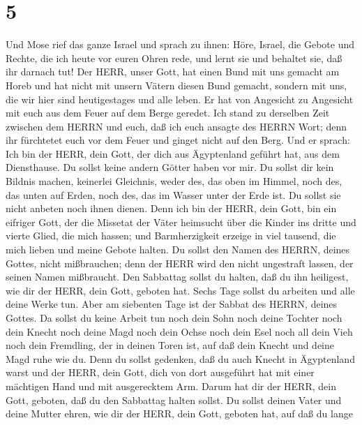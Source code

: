 \hypertarget{section-4}{%
\section{5}\label{section-4}}

 Und Mose rief das ganze Israel und sprach zu ihnen: Höre,
Israel, die Gebote und Rechte, die ich heute vor euren Ohren rede, und
lernt sie und behaltet sie, daß ihr darnach tut!  Der HERR,
unser Gott, hat einen Bund mit uns gemacht am Horeb  und hat
nicht mit unsern Vätern diesen Bund gemacht, sondern mit uns, die wir
hier sind heutigestages und alle leben.  Er hat von
Angesicht zu Angesicht mit euch aus dem Feuer auf dem Berge geredet.
 Ich stand zu derselben Zeit zwischen dem HERRN und euch,
daß ich euch ansagte des HERRN Wort; denn ihr fürchtetet euch vor dem
Feuer und ginget nicht auf den Berg. Und er sprach:  Ich bin
der HERR, dein Gott, der dich aus Ägyptenland geführt hat, aus dem
Diensthause.  Du sollst keine andern Götter haben vor mir.
 Du sollst dir kein Bildnis machen, keinerlei Gleichnis,
weder des, das oben im Himmel, noch des, das unten auf Erden, noch des,
das im Wasser unter der Erde ist.  Du sollst sie nicht
anbeten noch ihnen dienen. Denn ich bin der HERR, dein Gott, bin ein
eifriger Gott, der die Missetat der Väter heimsucht über die Kinder ins
dritte und vierte Glied, die mich hassen;  und
Barmherzigkeit erzeige in viel tausend, die mich lieben und meine Gebote
halten.  Du sollst den Namen des HERRN, deines Gottes,
nicht mißbrauchen; denn der HERR wird den nicht ungestraft lassen, der
seinen Namen mißbraucht.  Den Sabbattag sollst du halten,
daß du ihn heiligest, wie dir der HERR, dein Gott, geboten hat.
 Sechs Tage sollst du arbeiten und alle deine Werke tun.
 Aber am siebenten Tage ist der Sabbat des HERRN, deines
Gottes. Da sollst du keine Arbeit tun noch dein Sohn noch deine Tochter
noch dein Knecht noch deine Magd noch dein Ochse noch dein Esel noch all
dein Vieh noch dein Fremdling, der in deinen Toren ist, auf daß dein
Knecht und deine Magd ruhe wie du.  Denn du sollst
gedenken, daß du auch Knecht in Ägyptenland warst und der HERR, dein
Gott, dich von dort ausgeführt hat mit einer mächtigen Hand und mit
ausgerecktem Arm. Darum hat dir der HERR, dein Gott, geboten, daß du den
Sabbattag halten sollst.  Du sollst deinen Vater und deine
Mutter ehren, wie dir der HERR, dein Gott, geboten hat, auf daß du lange

